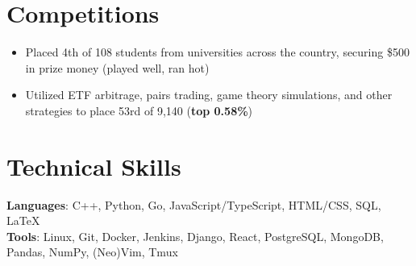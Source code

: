 \documentclass[letterpaper,11pt]{article}
\begin{document}
\section{Competitions}
\begin{itemize}
  \item Placed 4th of 108 students from universities across the country,
        securing \$500 in prize money (played well, ran hot)
\end{itemize}
\begin{itemize}
  \item Utilized ETF arbitrage, pairs trading, game theory simulations, and
        other strategies to place 53rd of 9,140 (\textbf{top 0.58\%})
\end{itemize}
\section{Technical Skills}
\textbf{Languages}: C++, Python, Go, JavaScript/TypeScript, HTML/CSS, SQL,
\LaTeX \\
\textbf{Tools}: Linux, Git, Docker, Jenkins, Django, React,
PostgreSQL, MongoDB, Pandas, NumPy, (Neo)Vim, Tmux
\end{document}
